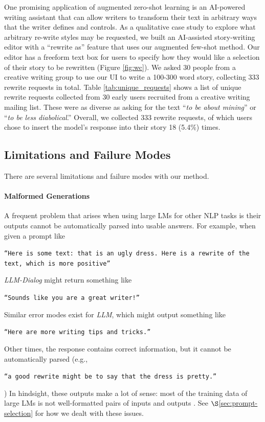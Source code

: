 One promising application of augmented zero-shot learning is an AI-powered writing assistant that can allow writers to transform their text in arbitrary ways that the writer defines and controls.
As a qualitative case study to explore what arbitrary re-write styles may be requested, we built an AI-assisted story-writing editor with a ``rewrite as'' feature that uses our augmented few-shot method.
Our editor has a freeform text box for users to specify how they would like a selection of their story to be rewritten (Figure \ref{fig:wc}).
We asked 30 people from a creative writing group to use our UI to write a 100-300 word story,  collecting 333 rewrite requests in total. 
Table \ref{tab:unique_requests} shows a list of unique rewrite requests collected from 30 early users recruited from a creative writing mailing list.
These were as diverse as asking for the text ``\textit{to be about mining}'' or ``\textit{to be less diabolical}.''
Overall, we collected 333 rewrite requests, of which users chose to insert the model's response into their story 18 (5.4\%) times.


\subsection{Limitations and Failure Modes}
\label{section:limitations}
There are several limitations and failure modes with our method.

\paragraph{Malformed Generations} A frequent problem that arises when using large LMs for other NLP tasks is their outputs cannot be automatically parsed into usable answers. For example, when given a prompt like \begin{small}
 \texttt{``Here is some text: {that is an ugly dress}. Here is a rewrite of the text, which is more positive''} \end{small}
 \textit{LLM-Dialog} might return something like \begin{small}
 \texttt{``Sounds like you are a great writer!''} \end{small} Similar error modes exist for \textit{LLM}, which might output something like \begin{small}
 \texttt{``Here are more writing tips and tricks.''} \end{small} Other times, the response contains correct information, but it cannot be automatically parsed (e.g., \begin{small}
 \texttt{``a good rewrite might be to say that the dress is pretty.''} \end{small}) In hindsight, these outputs make a lot of sense: most of the training data of large LMs is not well-formatted pairs of inputs and outputs  \citep{reynolds2021prompt}. See $\S$\ref{sec:prompt-selection} for how we dealt with these issues.

